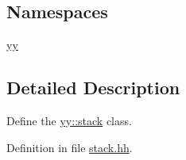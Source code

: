 \subsection*{Namespaces}
\begin{DoxyCompactItemize}
\item 
\hyperlink{namespaceyy}{yy}
\end{DoxyCompactItemize}


\subsection{Detailed Description}
Define the \hyperlink{classyy_1_1stack}{yy\-::stack} class. 

Definition in file \hyperlink{stack_8hh_source}{stack.\-hh}.


